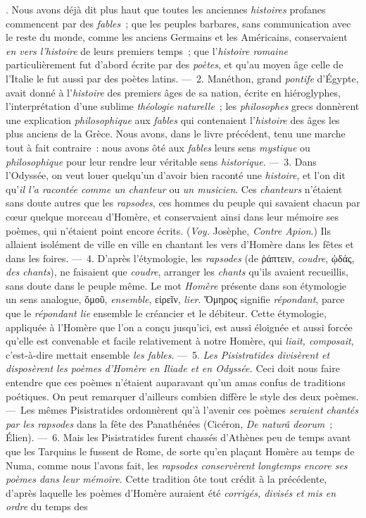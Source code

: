 \documentclass[french,twoside]{book} %
\newcommand\chaptercont{} %
\begin{document}
\chaptercont
{}. Nous avons déjà dit plus haut que toutes les anciennes {\itshape histoires} profanes commencent par des {\itshape fables} ; que les peuples barbares, sans communication avec le reste du monde, comme les anciens Germains et les Américains, conservaient {\itshape en vers l’histoire} de leurs premiers temps ; que l’{\itshape histoire romaine} particulièrement fut d’abord écrite par des {\itshape poètes}, et qu’au moyen âge celle de l’Italie le fut aussi par des poètes latins. — 2. Manéthon, grand {\itshape pontife} d’Égypte, avait donné à l’{\itshape histoire} des premiers âges de sa nation, écrite en hiéroglyphes, l’interprétation d’une sublime {\itshape théologie naturelle} ; les {\itshape philosophes} grecs donnèrent une explication {\itshape philosophique} aux {\itshape fables} qui contenaient l’{\itshape histoire} des âges les plus anciens de la Grèce. Nous avons, dans le livre précédent, tenu une marche tout à fait contraire : nous avons ôté aux {\itshape fables} leurs sens {\itshape mystique} ou {\itshape philosophique} pour leur rendre leur véritable sens {\itshape historique}. — 3. Dans l’Odyssée, on veut louer quelqu’un d’avoir bien raconté une {\itshape histoire}, et l’on dit qu’{\itshape il l’a racontée comme un chanteur} ou {\itshape un musicien}. Ces {\itshape chanteurs} n’étaient sans doute autres  que les {\itshape rapsodes}, ces hommes du peuple qui savaient chacun par cœur quelque morceau d’Homère, et conservaient ainsi dans leur mémoire ses poèmes, qui n’étaient point encore écrits. ({\itshape Voy.} Josèphe, {\itshape Contre Apion}.) Ils allaient isolément de ville en ville en chantant les vers d’Homère dans les fêtes et dans les foires. — 4. D’après l’étymologie, les {\itshape rapsodes} (de ῥάπτειν, {\itshape coudre}, ᾠδάς, {\itshape des chants}), ne faisaient que {\itshape coudre}, arranger les {\itshape chants} qu’ils avaient recueillis, sans doute dans le peuple même. Le mot {\itshape Homère} présente dans son étymologie un sens analogue, ὅμοῦ, {\itshape ensemble}, εἰρεῖν, {\itshape lier}. Ὅμηρος signifie {\itshape répondant}, parce que le {\itshape répondant lie} ensemble le créancier et le débiteur. Cette étymologie, appliquée à l’Homère que l’on a conçu jusqu’ici, est aussi éloignée et aussi forcée qu’elle est convenable et facile relativement à notre Homère, qui {\itshape liait, composait}, c’est-à-dire mettait ensemble {\itshape les fables}. — 5. {\itshape Les Pisistratides divisèrent et disposèrent les poèmes d’Homère en Iliade et en Odyssée.} Ceci doit nous faire entendre que ces poèmes n’étaient auparavant qu’un amas confus de traditions poétiques. On peut remarquer d’ailleurs combien diffère le style des deux poèmes. — Les mêmes Pisistratides ordonnèrent qu’à l’avenir ces poèmes {\itshape seraient chantés par les rapsodes} dans la fête des Panathénées (Cicéron, {\itshape De naturâ deorum} ; Élien). — 6. Mais les Pisistratides furent chassés d’Athènes peu de temps avant que les Tarquins le fussent de Rome, de sorte qu’en plaçant Homère au temps de Numa,  comme nous l’avons fait, les {\itshape rapsodes conservèrent longtemps encore ses poèmes dans leur mémoire}. Cette tradition ôte tout crédit à la précédente, d’après laquelle les poèmes d’Homère auraient été {\itshape corrigés, divisés et mis en ordre} du temps des 
\end{document}
